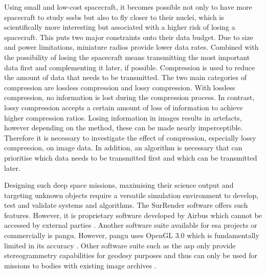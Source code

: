 Using small and low-cost spacecraft, it becomes possible not only to have more spacecraft to study \glspl{sssb} but also to fly closer to their nuclei, which is scientifically more interesting but associated with a higher risk of losing a spacecraft. This puts two major constraints onto their data budget. Due to size and power limitations, miniature radios provide lower data rates. Combined with the possibility of losing the spacecraft means transmitting the most important data first and complementing it later, if possible. Compression is used to reduce the amount of data that needs to be transmitted. The two main categories of compression are lossless compression and lossy compression. With lossless compression, no information is lost during the compression process. In contrast, lossy compression accepts a certain amount of loss of information to achieve higher compression ratios. Losing information in images results in artefacts, however depending on the method, these can be made nearly imperceptible. Therefore it is necessary to investigate the effect of compression, especially lossy compression, on image data. In addition, an algorithm is necessary that can prioritise which data needs to be transmitted first and which can be transmitted later.

Designing such deep space missions, maximising their science output and targeting unknown objects require a versatile simulation environment to develop, test and validate systems and algorithms. The SurRender software offers such features. However, it is proprietary software developed by Airbus which cannot be accessed by external parties \cite{Brochard2018ScientificSoftware}. Another software suite available for \gls{esa} projects or commercially is \gls{pangu}. However, \gls{pangu} uses OpenGL 3.0 which is fundamentally limited in its accuracy \cite{Martin2019PlanetaryPANGU}. Other software suite such as the \gls{asp} only provide stereogrammetry capabilities for geodesy purposes and thus can only be used for missions to bodies with existing image archives \cite{Beyer2018TheData}.

